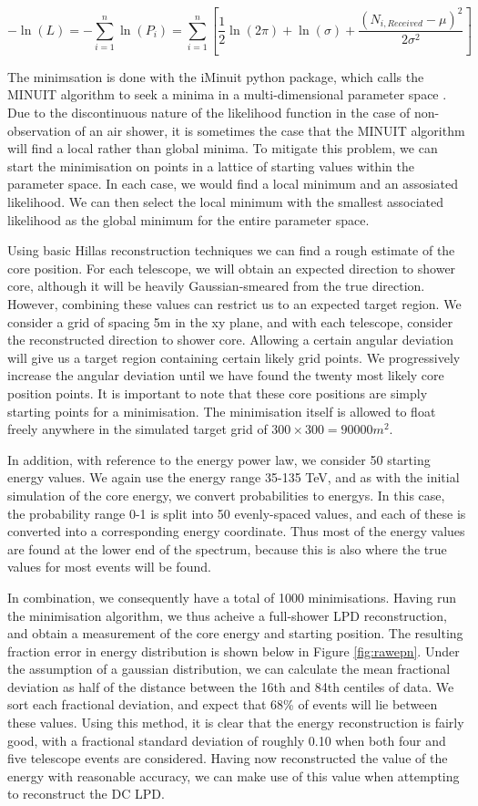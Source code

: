 \documentclass[11pt]{article}
\begin{document}
\[ - \ln(L) = - \sum_{i=1}^{n} \ln(P_{i}) =  \sum_{i=1}^{n} [ \frac{1}{2}\ln(2 \pi) + \ln(\sigma) + \frac{(N_{i, Received} - \mu)^{2}}{2 \sigma^{2}}]\]

The minimsation is done with the iMinuit python package, which calls the MINUIT algorithm to seek a minima in a multi-dimensional parameter space \cite{James75}. Due to the discontinuous nature of the likelihood function in the case of non-observation of an air shower, it is sometimes the case that the MINUIT algorithm will find a local rather than global minima. To mitigate this problem, we can start the minimisation on points in a lattice of starting values within the parameter space. In each case, we would find a local minimum and an assosiated likelihood. We can then select the local minimum with the smallest associated likelihood as the global minimum for the entire parameter space. 

Using basic Hillas reconstruction techniques we can find a rough estimate of the core position. For each telescope, we will obtain an expected direction to shower core, although it will be heavily Gaussian-smeared from the true direction. However, combining these values can restrict us to an expected target region. We consider a grid of spacing 5m in the xy plane, and with each telescope, consider the reconstructed direction to shower core. Allowing a certain angular deviation will give us a target region containing certain likely grid points. We progressively increase the angular deviation until we have found the twenty most likely core position points. It is important to note that these core positions are simply starting points for a minimisation. The minimisation itself is allowed to float freely anywhere in the simulated target grid of $300 \times 300 = 90000 m^{2}$.

In addition, with reference to the energy power law, we consider 50 starting energy values. We again use the energy range 35-135 TeV, and as with the initial simulation of the core energy, we convert probabilities to energys. In this case, the probability range 0-1 is split into 50 evenly-spaced values, and each of these is converted into a corresponding energy coordinate. Thus most of the energy values are found at the lower end of the spectrum, because this is also where the true values for most events will be found.

In combination, we consequently have a total of 1000 minimisations. Having run the minimisation algorithm, we thus acheive a full-shower LPD reconstruction, and obtain a measurement of the core energy and starting position. The resulting fraction error in energy distribution is shown below in Figure \ref{fig:rawepn}. Under the assumption of a gaussian distribution, we can calculate the mean fractional deviation as half of the distance between the 16th and 84th centiles of data. We sort each fractional deviation, and expect that 68\% of events will lie between these values. Using this method, it is clear that the energy reconstruction is fairly good, with a fractional standard deviation of roughly 0.10 when both four and five telescope events are considered. Having now reconstructed the value of the energy with reasonable accuracy, we can make use of this value when attempting to reconstruct the DC LPD. 
\end{document}
